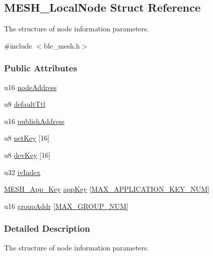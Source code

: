 \hypertarget{struct_m_e_s_h___local_node}{}\subsection{M\+E\+S\+H\+\_\+\+Local\+Node Struct Reference}
\label{struct_m_e_s_h___local_node}


The structure of node information parameters.  




{\ttfamily \#include $<$ble\+\_\+mesh.\+h$>$}

\subsubsection*{Public Attributes}
\begin{DoxyCompactItemize}
\item 
u16 \hyperlink{struct_m_e_s_h___local_node_adbc7151638557d67a10c44e6a87ba7e7}{node\+Address}
\item 
u8 \hyperlink{struct_m_e_s_h___local_node_a50b78613fc75b3d0d6c63105c9f47c3e}{default\+Ttl}
\item 
u16 \hyperlink{struct_m_e_s_h___local_node_a0c2b076ef25341d7f473cc73b0b5f792}{publish\+Address}
\item 
u8 \hyperlink{struct_m_e_s_h___local_node_a5236a0d008e2cfcc63a9d4756d9b35cf}{net\+Key} \mbox{[}16\mbox{]}
\item 
u8 \hyperlink{struct_m_e_s_h___local_node_a30555cec6343073e50ac7b3fe47068d3}{dev\+Key} \mbox{[}16\mbox{]}
\item 
u32 \hyperlink{struct_m_e_s_h___local_node_a4250d93a5fc69be1340181fdb220b438}{iv\+Index}
\item 
\hyperlink{struct_m_e_s_h___app___key}{M\+E\+S\+H\+\_\+\+App\+\_\+\+Key} \hyperlink{struct_m_e_s_h___local_node_a07408320254be35a242bf3fd68d1da10}{app\+Key} \mbox{[}\hyperlink{group___m_e_s_h___a_p_p___k_e_y___n_u_m_gac77a9999095f79330fc88bf8a24a1dc7}{M\+A\+X\+\_\+\+A\+P\+P\+L\+I\+C\+A\+T\+I\+O\+N\+\_\+\+K\+E\+Y\+\_\+\+N\+UM}\mbox{]}
\item 
u16 \hyperlink{struct_m_e_s_h___local_node_abf2b23008c2b6c88c4ad29108add9670}{group\+Addr} \mbox{[}\hyperlink{group___m_e_s_h___g_r_o_u_p___n_u_m_ga4c4e392ad838b407e834d8fc117f797c}{M\+A\+X\+\_\+\+G\+R\+O\+U\+P\+\_\+\+N\+UM}\mbox{]}
\end{DoxyCompactItemize}


\subsubsection{Detailed Description}
The structure of node information parameters. 

